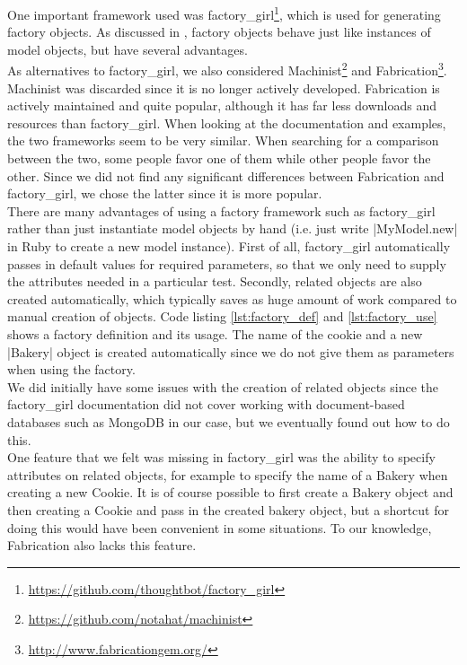 \MakeShortVerb{\|}

One important framework used was
factory\_girl\footnote{\url{https://github.com/thoughtbot/factory\_girl}},
which is used for generating factory objects. As discussed in
, factory objects behave just like instances of
model objects, but have several advantages.\\

As alternatives to factory\_girl, we also considered
Machinist\footnote{\url{https://github.com/notahat/machinist}} and
Fabrication\footnote{\url{http://www.fabricationgem.org/}}. Machinist
was discarded since it is no longer actively developed. Fabrication is
actively maintained and quite popular, although it has far less
downloads and resources than factory\_girl. When looking at the
documentation and examples, the two frameworks seem to be very similar.
When searching for a comparison between the two, some people favor one
of them while other people favor the other. Since we did not find any
significant differences between Fabrication and factory\_girl, we chose
the latter since it is more popular.\\

There are many advantages of using a factory framework such as
factory\_girl rather than just instantiate model objects by hand (i.e.
just write |MyModel.new| in Ruby to create a new model instance). First
of all, factory\_girl automatically passes in default values for
required parameters, so that we only need to supply the attributes
needed in a particular test. Secondly, related objects are also created
automatically, which typically saves as huge amount of work compared to
manual creation of objects. Code listing \ref{lst:factory_def} and
\ref{lst:factory_use} shows a factory definition and its usage. The name
of the cookie and a new |Bakery| object is created automatically since we
do not give them as parameters when using the factory.\\

We did initially have some issues with the creation of related objects
since the factory\_girl documentation did not cover working with
document-based databases such as MongoDB in our case, but we eventually
found out how to do this.\\

One feature that we felt was missing in factory\_girl was the ability to
specify attributes on related objects, for example to specify the name
of a Bakery when creating a new Cookie. It is of course possible to
first create a Bakery object and then creating a Cookie and pass in the
created bakery object, but a shortcut for doing this would have been
convenient in some situations. To our knowledge, Fabrication also lacks
this feature.\\


